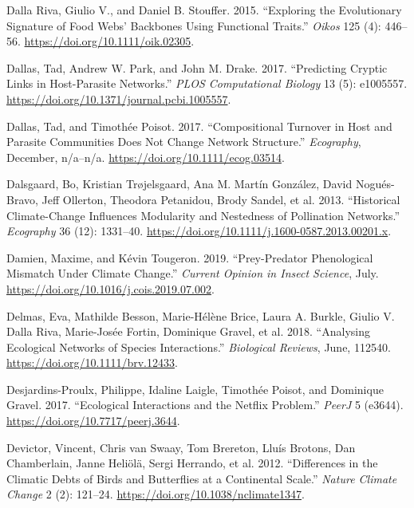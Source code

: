 \documentclass[11pt]{article}
\begin{document}
\leavevmode\hypertarget{ref-DallStou15}{}%
Dalla Riva, Giulio V., and Daniel B. Stouffer. 2015. ``Exploring the
Evolutionary Signature of Food Webs' Backbones Using Functional
Traits.'' \emph{Oikos} 125 (4): 446--56.
\url{https://doi.org/10.1111/oik.02305}.

\leavevmode\hypertarget{ref-DallPark17}{}%
Dallas, Tad, Andrew W. Park, and John M. Drake. 2017. ``Predicting
Cryptic Links in Host-Parasite Networks.'' \emph{PLOS Computational
Biology} 13 (5): e1005557.
\url{https://doi.org/10.1371/journal.pcbi.1005557}.

\leavevmode\hypertarget{ref-DallPois17}{}%
Dallas, Tad, and Timothée Poisot. 2017. ``Compositional Turnover in Host
and Parasite Communities Does Not Change Network Structure.''
\emph{Ecography}, December, n/a--n/a.
\url{https://doi.org/10.1111/ecog.03514}.

\leavevmode\hypertarget{ref-DalsTroj13}{}%
Dalsgaard, Bo, Kristian Trøjelsgaard, Ana M. Martín González, David
Nogués-Bravo, Jeff Ollerton, Theodora Petanidou, Brody Sandel, et al.
2013. ``Historical Climate-Change Influences Modularity and Nestedness
of Pollination Networks.'' \emph{Ecography} 36 (12): 1331--40.
\url{https://doi.org/10.1111/j.1600-0587.2013.00201.x}.

\leavevmode\hypertarget{ref-DamiToug19}{}%
Damien, Maxime, and Kévin Tougeron. 2019. ``Prey-Predator Phenological
Mismatch Under Climate Change.'' \emph{Current Opinion in Insect
Science}, July. \url{https://doi.org/10.1016/j.cois.2019.07.002}.

\leavevmode\hypertarget{ref-DelmBess18}{}%
Delmas, Eva, Mathilde Besson, Marie-Hélène Brice, Laura A. Burkle,
Giulio V. Dalla Riva, Marie-Josée Fortin, Dominique Gravel, et al. 2018.
``Analysing Ecological Networks of Species Interactions.''
\emph{Biological Reviews}, June, 112540.
\url{https://doi.org/10.1111/brv.12433}.

\leavevmode\hypertarget{ref-DesjLaig17}{}%
Desjardins-Proulx, Philippe, Idaline Laigle, Timothée Poisot, and
Dominique Gravel. 2017. ``Ecological Interactions and the Netflix
Problem.'' \emph{PeerJ} 5 (e3644).
\url{https://doi.org/10.7717/peerj.3644}.

\leavevmode\hypertarget{ref-Devivan12}{}%
Devictor, Vincent, Chris van Swaay, Tom Brereton, Lluís Brotons, Dan
Chamberlain, Janne Heliölä, Sergi Herrando, et al. 2012. ``Differences
in the Climatic Debts of Birds and Butterflies at a Continental Scale.''
\emph{Nature Climate Change} 2 (2): 121--24.
\url{https://doi.org/10.1038/nclimate1347}.
\end{document}

